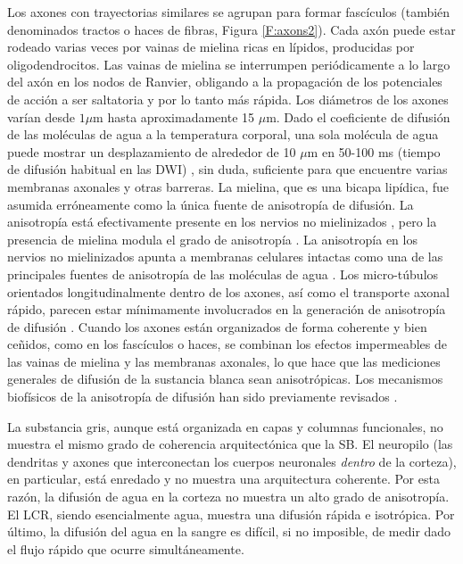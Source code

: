 Los axones con trayectorias similares se agrupan para formar fascículos (también denominados tractos o haces de fibras, Figura \ref{F:axons2}). Cada axón puede estar rodeado varias veces por vainas de mielina ricas en lípidos, producidas por oligodendrocitos. Las vainas de mielina se interrumpen periódicamente a lo largo del axón en los nodos de Ranvier, obligando a la propagación de los potenciales de acción a ser saltatoria y por lo tanto más rápida. Los diámetros de los axones varían desde $1 \mu$m hasta aproximadamente 15 \(\mu\)m. Dado el coeficiente de difusión de las moléculas de agua a la temperatura corporal, una sola molécula de agua puede mostrar un desplazamiento de alrededor de 10 \(\mu\)m en 50-100 ms (tiempo de difusión habitual en las DWI) \cite{Le_Bihan_2002}, sin duda, suficiente para que encuentre varias membranas axonales y otras barreras. La mielina, que es una bicapa lipídica, fue asumida erróneamente como la única fuente de anisotropía de difusión. La anisotropía está efectivamente presente en los nervios no mielinizados \cite{Beaulieu_1994,Gulani_2001}, pero la presencia de mielina modula el grado de anisotropía \cite{Gulani_2001,Tyszka_2006}. La anisotropía en los nervios no mielinizados apunta a membranas celulares intactas como una de las principales fuentes de anisotropía de las moléculas de agua \cite{Beaulieu_1994,Gulani_2001}. Los micro-túbulos orientados longitudinalmente dentro de los axones, así como el transporte axonal rápido, parecen estar mínimamente involucrados en la generación de anisotropía de difusión \cite{Beaulieu_1994}. Cuando los axones están organizados de forma coherente y bien ceñidos, como en los fascículos o haces, se combinan los efectos impermeables de las vainas de mielina y las membranas axonales, lo que hace que las mediciones generales de difusión de la sustancia blanca sean anisotrópicas. Los mecanismos biofísicos de la anisotropía de difusión han sido previamente revisados \cite{Beaulieu2002}.

La substancia gris, aunque está organizada en capas y columnas funcionales, no muestra el mismo grado de coherencia arquitectónica que la SB. El neuropilo (las dendritas y axones que interconectan los cuerpos neuronales \emph {dentro} de la corteza), en particular, está enredado y no muestra una arquitectura coherente. Por esta razón, la difusión de agua en la corteza no muestra un alto grado de anisotropía. El LCR, siendo esencialmente agua, muestra una difusión rápida e isotrópica. Por último, la difusión del agua en la sangre es difícil, si no imposible, de medir dado el flujo rápido que ocurre simultáneamente.

